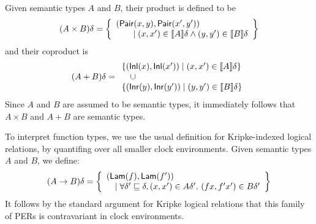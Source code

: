Given semantic types $A$ and $B$, their product is defined to be
\begin{displaymath}
  (A \times B)\delta =
  \left\{
    \begin{array}{l}
      (\mathsf{Pair}(x,y),\mathsf{Pair}(x',y')) \\
      \quad\quad\mathrel| (x,x') \in \llbracket A \rrbracket\delta \land (y,y') \in \llbracket B \rrbracket\delta 
    \end{array}
  \right\}
\end{displaymath}
and their coproduct is
\begin{displaymath}
  (A + B)\delta =
  \begin{array}{l}
    \{ (\mathsf{Inl}(x), \mathsf{Inl}(x')) \mathrel| (x,x') \in \llbracket A \rrbracket\delta \} \\
    \quad \cup \\
    \{ (\mathsf{Inr}(y),\mathsf{Inr}(y')) \mathrel| (y,y') \in \llbracket B \rrbracket\delta \}
  \end{array}
\end{displaymath}
Since $A$ and $B$ are assumed to be semantic types, it immediately
follows that $A \times B$ and $A + B$ are semantic types.

To interpret function types, we use the usual definition for
Kripke-indexed logical relations, by quantifing over all smaller clock
environments. Given semantic types $A$ and $B$, we define:
\begin{displaymath}
  (A \to B)\delta = \left\{
    \begin{array}{l}
      (\mathsf{Lam}(f),\mathsf{Lam}(f')) \\
      \quad \mathrel| \forall \delta' \sqsubseteq \delta, (x,x') \in A\delta'.\ (fx,f'x') \in B\delta'
    \end{array}
  \right\}
\end{displaymath}
It follows by the standard argument for Kripke logical relations that
this family of PERs is contravariant in clock environments.

